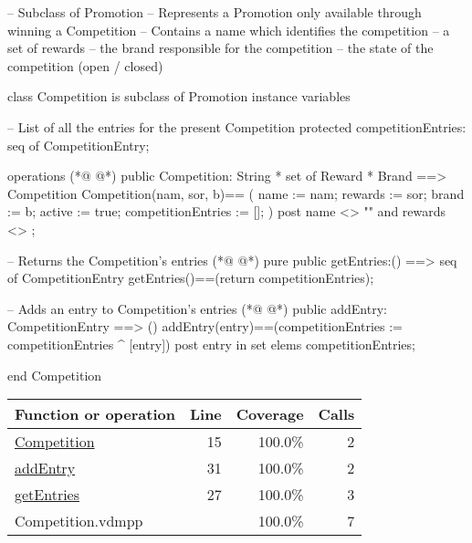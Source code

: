 \begin{vdmpp}[breaklines=true]
-- Subclass of Promotion
-- Represents a Promotion only available through winning a Competition
-- Contains a name which identifies the competition
--      a set of rewards
--          the brand responsible for the competition
--      the state of the competition (open / closed)

class Competition is subclass of Promotion   
 instance variables
   
  -- List of all the entries for the present Competition
  protected competitionEntries: seq of CompetitionEntry;

 operations
(*@
\label{Competition:15}
@*)
  public Competition: String * set of Reward * Brand ==> Competition
  Competition(nam, sor, b)== 
  (
    name := nam;
    rewards := sor;
    brand := b;
    active := true;
    competitionEntries := [];
  )
  post name <> "" and rewards <> {};
    
   -- Returns the Competition's entries
(*@
\label{getEntries:27}
@*)
  pure public getEntries:() ==> seq of CompetitionEntry
    getEntries()==(return competitionEntries);  

  -- Adds an entry to Competition's entries
(*@
\label{addEntry:31}
@*)
   public addEntry: CompetitionEntry ==> ()
   addEntry(entry)==(competitionEntries := competitionEntries ^ [entry])
   post entry in set elems competitionEntries;

end Competition
\end{vdmpp}
\bigskip
\begin{longtable}{|l|r|r|r|}
\hline
Function or operation & Line & Coverage & Calls \\
\hline
\hline
\hyperref[Competition:15]{Competition} & 15&100.0\% & 2 \\
\hline
\hyperref[addEntry:31]{addEntry} & 31&100.0\% & 2 \\
\hline
\hyperref[getEntries:27]{getEntries} & 27&100.0\% & 3 \\
\hline
\hline
Competition.vdmpp & & 100.0\% & 7 \\
\hline
\end{longtable}

